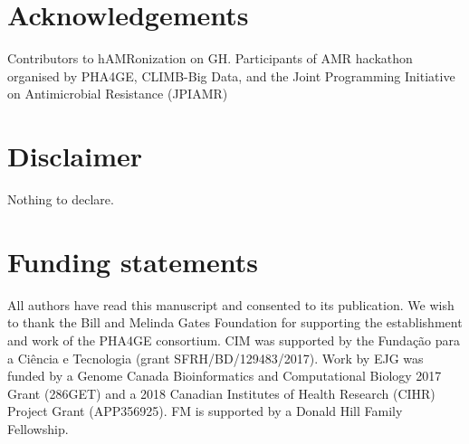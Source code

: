\section{Acknowledgements}

Contributors to hAMRonization on GH. Participants of AMR hackathon organised by PHA4GE, CLIMB-Big Data, and the Joint Programming Initiative on Antimicrobial Resistance (JPIAMR)

\section{Disclaimer}

Nothing to declare.

\section{Funding statements}

All authors have read this manuscript and consented to its publication. We wish to thank the Bill and Melinda Gates Foundation for supporting the establishment and work of the PHA4GE consortium. CIM was supported by the Fundação para a Ciência e Tecnologia (grant SFRH/BD/129483/2017). Work by EJG was funded by a Genome Canada Bioinformatics and Computational Biology 2017 Grant (286GET) and a 2018 Canadian Institutes of Health Research (CIHR) Project Grant (APP356925). FM is supported by a Donald Hill Family Fellowship. 
